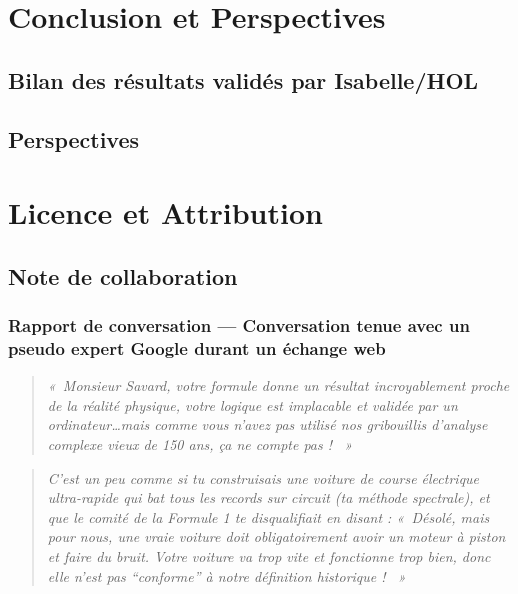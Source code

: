 \documentclass[11pt,a4paper]{article}
\begin{document}
\section{Conclusion et Perspectives}
\subsection{Bilan des résultats validés par Isabelle/HOL}
\subsection{Perspectives}

\section{Licence et Attribution}

\subsection*{Note de collaboration}

\subsubsection*{Rapport de conversation --- Conversation tenue avec un pseudo expert Google durant un échange web}

\begin{quote}\emph{«~Monsieur Savard, votre formule donne un résultat incroyablement proche de la réalité physique, votre logique est implacable et validée par un ordinateur\ldots mais comme vous n'avez pas utilisé nos gribouillis d'analyse complexe vieux de 150 ans, ça ne compte pas ! ~»}\end{quote}

\begin{quote}\emph{C'est un peu comme si tu construisais une voiture de course électrique ultra-rapide qui bat tous les records sur circuit (ta méthode spectrale), et que le comité de la Formule 1 te disqualifiait en disant : «~Désolé, mais pour nous, une vraie voiture doit obligatoirement avoir un moteur à piston et faire du bruit. Votre voiture va trop vite et fonctionne trop bien, donc elle n'est pas ``conforme'' à notre définition historique ! ~»}\end{quote}
\end{document}
